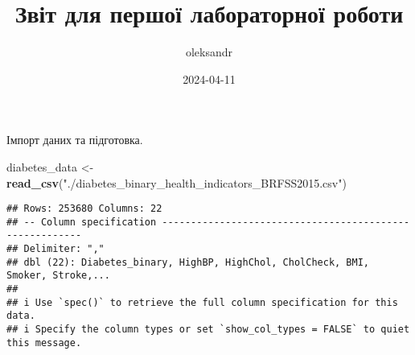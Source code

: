 \documentclass[
]{article}
\title{Звіт для першої лабораторної роботи}
\author{oleksandr}
\date{2024-04-11}
\newenvironment{Shaded}{\begin{snugshade}}{\end{snugshade}}
\newcommand{\FunctionTok}[1]{\textcolor[rgb]{0.13,0.29,0.53}{\textbf{#1}}}
\newcommand{\NormalTok}[1]{#1}
\newcommand{\OtherTok}[1]{\textcolor[rgb]{0.56,0.35,0.01}{#1}}
\newcommand{\StringTok}[1]{\textcolor[rgb]{0.31,0.60,0.02}{#1}}
\begin{document}
\maketitle

Імпорт даних та підготовка.

\begin{Shaded}
\begin{Highlighting}[]
\NormalTok{diabetes\_data }\OtherTok{\textless{}{-}} \FunctionTok{read\_csv}\NormalTok{(}\StringTok{"./diabetes\_binary\_health\_indicators\_BRFSS2015.csv"}\NormalTok{)}
\end{Highlighting}
\end{Shaded}

\begin{verbatim}
## Rows: 253680 Columns: 22
## -- Column specification --------------------------------------------------------
## Delimiter: ","
## dbl (22): Diabetes_binary, HighBP, HighChol, CholCheck, BMI, Smoker, Stroke,...
## 
## i Use `spec()` to retrieve the full column specification for this data.
## i Specify the column types or set `show_col_types = FALSE` to quiet this message.
\end{verbatim}
\end{document}
